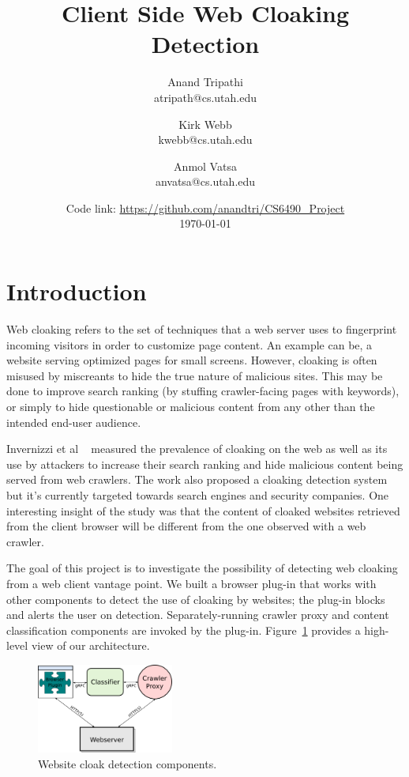 \documentclass[letterpaper,twocolumn,10pt]{article}
\title{\vspace{-2.0cm}Client Side Web Cloaking Detection}
\author{
Anand Tripathi\\
       atripath@cs.utah.edu
\and
Kirk Webb\\
       kwebb@cs.utah.edu
\and
Anmol Vatsa\\
       anvatsa@cs.utah.edu
}
\date{Code link: \url{https://github.com/anandtri/CS6490\_Project}\\
\today}
\begin{document}
\maketitle

\section{Introduction}
Web cloaking refers to the set of techniques that a web server uses to fingerprint incoming visitors in order to customize page content. An example can be, a website serving optimized pages for small screens. However, cloaking is often misused by miscreants to hide the true nature of malicious sites.  This may be done to improve search ranking (by stuffing crawler-facing pages with keywords), or simply to hide questionable or malicious content from any other than the intended end-user audience.

Invernizzi et al ~\cite{cloak} measured the prevalence of cloaking on the web as well as its use by attackers to increase their search ranking and hide malicious content being served from web crawlers. The work also proposed a cloaking detection system but it's currently targeted towards search engines and security companies. One interesting insight of the study was that the content of cloaked websites retrieved from the client browser will be different from the one observed with a web crawler.

The goal of this project is to investigate the possibility of detecting web cloaking from a web client vantage point.  We built a browser plug-in that works with other components to detect the use of cloaking by websites; the plug-in blocks and alerts the user on detection. Separately-running crawler proxy and content classification components are invoked by the plug-in.  Figure~\ref{fig:arch} provides a high-level view of our architecture.

\begin{figure}[ht]
  \centering
  \includegraphics[width=0.4\textwidth]{./proj-diagram.png}
  \caption{Website cloak detection components.}
  \label{fig:arch}
\end{figure}
\end{document}
